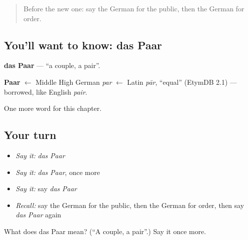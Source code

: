 \label{lesson:GE-C235-paar}



\begin{quote}
Before the new one: say the German for the public, then the German for order.
\end{quote}

\subsection*{You'll want to know: das Paar}
\textbf{das Paar} — \textquotedblleft{}a couple, a pair\textquotedblright{}.

\begin{cousinweb}
\textbf{Paar} $\leftarrow$ Middle High German \emph{par} $\leftarrow$ Latin \emph{pār}, \textquotedblleft{}equal\textquotedblright{} (EtymDB 2.1) — borrowed, like English \emph{pair}.
\end{cousinweb}

\begin{grammarlens}[title={What you've built}]
One more word for this chapter.
\end{grammarlens}

\subsection*{Your turn}
\begin{itemize}
\raggedright
  \item \emph{Say it:} \emph{das Paar}
  \item \emph{Say it:} \emph{das Paar}, once more
  \item \emph{Say it:} say \emph{das Paar}
  \item \emph{Recall:} say the German for the public, then the German for order, then say \emph{das Paar} again
\end{itemize}

\begin{tcolorbox}[breakable,colback=teal!4,colframe=teal!35!black,title={Before you move on}]
What does das Paar mean? (\textquotedblleft{}A couple, a pair\textquotedblright{}.) Say it once more.
\end{tcolorbox}
